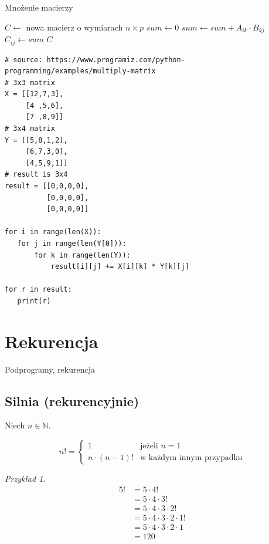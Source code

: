 \documentclass[10pt, oneside]{article}
\theoremstyle{remark}
\newtheorem*{example}{Przykład}
\begin{document}
\begin{algorithm}
    \caption{Mnożenie macierzy}
    \label{matmul}
    \begin{algorithmic}[1] %
            \State $C \gets $ nowa macierz o wymiarach $n \times p$
            			\State $sum \gets 0$
            				\State $sum \gets sum + A_{ik}\cdot B_{kj}$
	             	\EndFor
	             	\State $C_{ij} \gets sum$
	            	\EndFor
            	\EndFor
            \State \Return $C$
        \EndFunction
    \end{algorithmic}
\end{algorithm}

\begin{verbatim}
# source: https://www.programiz.com/python-programming/examples/multiply-matrix
# 3x3 matrix
X = [[12,7,3],
     [4 ,5,6],
     [7 ,8,9]]
# 3x4 matrix
Y = [[5,8,1,2],
     [6,7,3,0],
     [4,5,9,1]]
# result is 3x4
result = [[0,0,0,0],
          [0,0,0,0],
          [0,0,0,0]]

for i in range(len(X)):
   for j in range(len(Y[0])):
       for k in range(len(Y)):
           result[i][j] += X[i][k] * Y[k][j]

for r in result:
   print(r)
\end{verbatim}


\section{Rekurencja}

Podprogramy, rekurencja

\subsection{Silnia (rekurencyjnie)}
Niech $n \in \mathbb{N}$.

\begin{equation*}
n! = \begin{cases}
1 &\text{jeżeli $n =1 $}\\
n\cdot (n-1)! &\text{w każdym innym przypadku}
\end{cases}
\end{equation*}

\begin{example}

\begin{align*}
5! &= 5 \cdot 4! \\
&= 5 \cdot 4 \cdot 3! \\  
&= 5 \cdot 4 \cdot 3 \cdot 2! \\  
&= 5 \cdot 4 \cdot 3 \cdot 2 \cdot 1! \\
&= 5 \cdot 4 \cdot 3 \cdot 2 \cdot 1 \\
&= 120
\end{align*}

\end{example}
\end{document}

